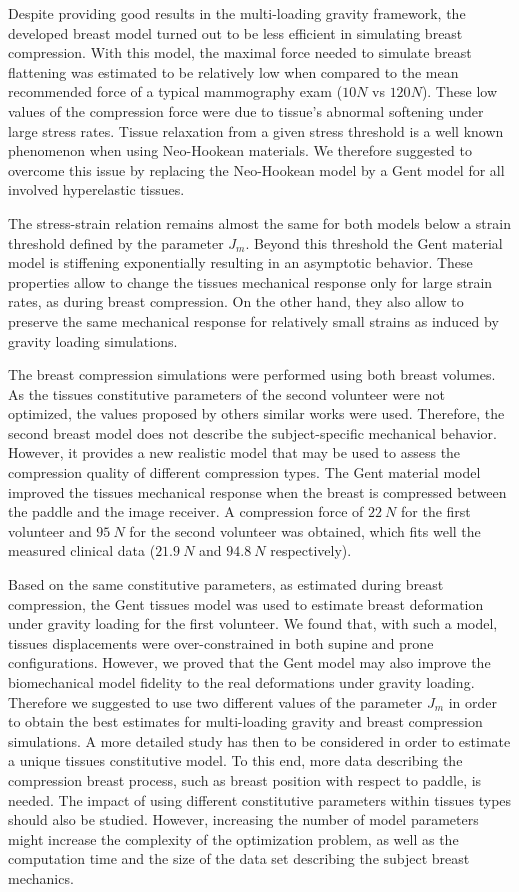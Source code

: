 Despite providing good results in the multi-loading gravity framework, the developed breast model turned out to be less efficient in simulating breast compression. With this model, the maximal force needed to simulate breast flattening was estimated to be relatively low when compared to the mean recommended force of a typical mammography exam ($10 N$ vs $120 N$). These low values of the compression force were due to tissue's abnormal softening under large stress rates. Tissue relaxation from a given stress threshold is a well known phenomenon when using Neo-Hookean materials. We therefore suggested to overcome this issue by replacing the Neo-Hookean model by a Gent model for all involved hyperelastic tissues.

The stress-strain relation remains almost the same for both models below a strain threshold defined by the parameter  $J_m$. Beyond this threshold the Gent material model is stiffening exponentially resulting in an asymptotic behavior. These properties allow to change the tissues mechanical response only for large strain rates, as during breast compression. On the other hand, they also allow to preserve the same mechanical response for relatively small strains as induced by gravity loading simulations.

The breast compression simulations were performed using both breast volumes. As the tissues constitutive parameters of the second volunteer were not optimized, the values proposed by others similar works were used. Therefore, the second breast model does not describe the subject-specific mechanical behavior. However, it provides  a new realistic model that may be used to assess the compression quality of different compression types. The Gent material model improved the tissues mechanical response when the breast is compressed between the paddle and the image receiver. A compression force of $22 \ N$ for the first volunteer and $95 \ N$ for the second volunteer was obtained, which fits well the measured clinical data ($21.9 \ N$ and $94.8 \ N$ respectively).  

Based on the same constitutive parameters, as estimated during breast compression, the Gent tissues model was used to estimate breast deformation under gravity loading for the first volunteer. We found that, with such a model, tissues displacements were over-constrained in both supine and prone configurations. However, we proved that the Gent model may also improve the biomechanical model fidelity to the real deformations under gravity loading. Therefore we suggested to use two different values of the parameter $J_m$ in order to obtain the best estimates for multi-loading gravity and breast compression simulations. A more detailed study has then to be considered in order to estimate a unique tissues constitutive model. To this end, more data describing the compression breast process, such as breast position with respect to paddle, is needed. The impact of using different constitutive parameters within tissues types should also be studied. However, increasing the number of model parameters might increase the complexity of the optimization problem, as well as the computation time and the size of the data set describing the subject breast mechanics.

